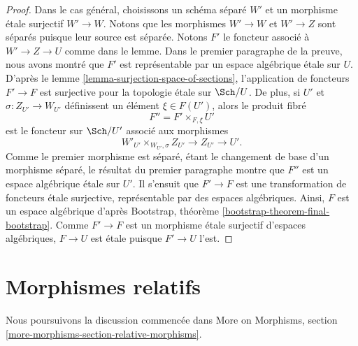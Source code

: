 \begin{proof}
\medskip\noindent
Dans le cas général, choisissons un schéma séparé $W'$ et un morphisme
étale surjectif $W' \to W$. Notons que les morphismes $W' \to W$ et
$W' \to Z$ sont séparés puisque leur source est séparée. Notons $F'$ le
foncteur associé à $W' \to Z \to U$ comme dans le lemme. Dans le premier
paragraphe de la preuve, nous avons montré que $F'$ est représentable par un
espace algébrique étale sur $U$. D'après le
lemme \ref{lemma-surjection-space-of-sections},
l'application de foncteurs $F' \to F$ est surjective pour la topologie étale
sur $\Sch/U$. De plus, si $U'$ et $\sigma : Z_{U'} \to W_{U'}$
définissent un élément $\xi \in F(U')$, alors le produit fibré
$$
F'' = F' \times_{F, \xi} U'
$$
est le foncteur sur $\Sch/U'$ associé aux morphismes
$$
W'_{U'} \times_{W_{U'}, \sigma} Z_{U'} \to Z_{U'} \to U'.
$$
Comme le premier morphisme est séparé, étant le changement de base d'un morphisme
séparé, le résultat du premier paragraphe montre que $F''$ est un espace algébrique
étale sur $U'$. Il s'ensuit que $F' \to F$ est une transformation de foncteurs
étale surjective, représentable par des espaces algébriques. Ainsi, $F$ est
un espace algébrique d'après Bootstrap, théorème
\ref{bootstrap-theorem-final-bootstrap}. Comme $F' \to F$ est un
morphisme étale surjectif d'espaces algébriques, $F \to U$ est étale
puisque $F' \to U$ l'est.
\end{proof}









\section{Morphismes relatifs}
\label{section-relative-morphisms}

\noindent
Nous poursuivons la discussion commencée dans
More on Morphisms, section \ref{more-morphisms-section-relative-morphisms}.

